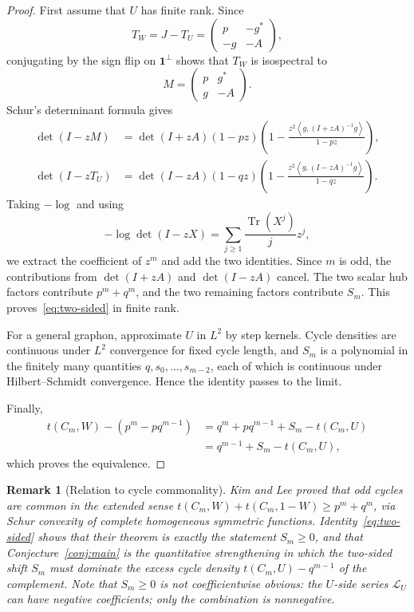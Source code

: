 \documentclass[11pt]{article}
\newtheorem{remark}[theorem]{Remark}
\newcommand{\one}{\mathbf 1}
\newcommand{\ip}[2]{\left\langle #1,#2\right\rangle}
\newcommand{\Tr}{\operatorname{Tr}}
\begin{document}
\begin{proof}
First assume that $U$ has finite rank.  Since
\[
        T_W=J-T_U=\begin{pmatrix}p&-g^*\\ -g&-A\end{pmatrix},
\]
conjugating by the sign flip on $\one^\perp$ shows that $T_W$ is isospectral to
\[
        M=\begin{pmatrix}p&g^*\\ g&-A\end{pmatrix}.
\]
Schur's determinant formula gives
\begin{align*}
        \det(I-zM)
        &=\det(I+zA)(1-pz)\left(1-\frac{z^2\ip{g}{(I+zA)^{-1}g}}{1-pz}\right),\\
        \det(I-zT_U)
        &=\det(I-zA)(1-qz)\left(1-\frac{z^2\ip{g}{(I-zA)^{-1}g}}{1-qz}\right).
\end{align*}
Taking $-\log$ and using
\[
        -\log\det(I-zX)=\sum_{j\ge1}\frac{\Tr(X^j)}jz^j,
\]
we extract the coefficient of $z^m$ and add the two identities.  Since $m$ is odd, the contributions from $\det(I+zA)$ and $\det(I-zA)$ cancel.  The two scalar hub factors contribute $p^m+q^m$, and the two remaining factors contribute $S_m$.  This proves~\eqref{eq:two-sided} in finite rank.

For a general graphon, approximate $U$ in $L^2$ by step kernels.  Cycle densities are continuous under $L^2$ convergence for fixed cycle length, and $S_m$ is a polynomial in the finitely many quantities $q,s_0,\ldots,s_{m-2}$, each of which is continuous under Hilbert--Schmidt convergence.  Hence the identity passes to the limit.

Finally,
\[
\begin{aligned}
        t(C_m,W)-(p^m-pq^{m-1})
        &=q^m+pq^{m-1}+S_m-t(C_m,U)\\
        &=q^{m-1}+S_m-t(C_m,U),
\end{aligned}
\]
which proves the equivalence.
\end{proof}

\begin{remark}[Relation to cycle commonality]\label{rmk:kimlee}
Kim and Lee \cite{KimLee} proved that odd cycles are common in the extended
sense $t(C_m,W)+t(C_m,1-W)\ge p^m+q^m$, via Schur convexity of complete
homogeneous symmetric functions.  Identity~\eqref{eq:two-sided} shows that
their theorem is exactly the statement $S_m\ge0$, and that
Conjecture~\ref{conj:main} is the quantitative strengthening in which the
two-sided shift $S_m$ must dominate the excess cycle density
$t(C_m,U)-q^{m-1}$ of the complement.  Note that $S_m\ge0$ is \emph{not}
coefficientwise obvious: the $U$-side series $\mathcal L_U$ can have negative
coefficients; only the combination is nonnegative.
\end{remark}
\end{document}
